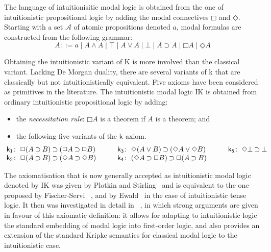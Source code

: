 \documentclass[twoside]{aiml18}
\newcommand*{\ax}[1]{\mathsf{#1}}
\newcommand*{\kax}[1][]		{\ax{k_{#1}}}
\newcommand*{\NOT}{\neg}
\newcommand*{\AND}{\mathbin{\wedge}}
\newcommand*{\TOP}{\mathord{\top}}
\newcommand*{\OR}{\mathbin{\vee}}
\newcommand*{\BOT}{\mathord{\bot}}
\newcommand*{\IMP}{\mathbin{\supset}}
\newcommand*{\BOX}{\mathord{\Box}}
\newcommand*{\DIA}{\mathord{\Diamond}}
\begin{document}
	
	The language of {intuitionisitic modal logic} is obtained from the one of intuitionistic propositional logic by adding the modal connectives $\BOX$ and $\DIA$. %
	Starting with a set $\mathcal{A}$ of atomic propositions denoted $a$, modal formulas are constructed from the following grammar:
	$$
	A  ::=
	a \mid A \AND A \mid \TOP \mid A \OR A \mid \BOT \mid A \IMP A \mid \BOX A \mid \DIA A
	$$

Obtaining the intuitionistic variant of K is more involved than the classical variant. Lacking
De Morgan duality, there are several variants of k that are classically but not intuitionistically
equivalent. Five axioms have been considered as primitives in the literature. The intuitionistic
modal logic IK is obtained from ordinary intuitionistic propositional logic by adding:
\begin{itemize}
\item the \emph{necessitation rule}: $\BOX A$ is a theorem if $A$ is a theorem; and
\item the following five variants of the $\kax$ axiom. 
\begin{equation*}
\label{eq:ik}\hskip-2em
\begin{array}[t]{r@{\;}l}
\kax[1]\colon&\BOX(A\IMP B)\IMP(\BOX A\IMP\BOX B)\\%
\kax[2]\colon&\BOX(A\IMP B)\IMP(\DIA A\IMP\DIA B)\\%
\end{array}
\qquad
\begin{array}[t]{r@{\;}l}
\kax[3]\colon&\DIA(A\OR B)\IMP(\DIA A\OR\DIA B)\\%
\kax[4]\colon&(\DIA A\IMP \BOX B)\IMP\BOX(A\IMP B)\\%
\end{array}
\qquad
\begin{array}[t]{r@{\;}l}
\kax[5]\colon&\DIA\BOT\IMP\BOT
\end{array}
\end{equation*}
\end{itemize}


The axiomatisation that is now generally accepted as intuitionistic modal logic denoted by IK was given by Plotkin and Stirling~\cite{Plotkin} and is equivalent to the one proposed by Fischer-Servi ~\cite{Fischer}, and by Ewald~\cite{Ewald} in the case of intuitionistic tense logic. 
%
It then was investigated in detail in ~\cite{Simpson}, in which strong arguments are given in favour of this axiomatic definition: 
%
it allows for adapting to intuitionistic logic the standard embedding of modal logic into first-order logic, and also provides an extension of the standard Kripke semantics for classical modal logic to the intuitionistic case.
\end{document}
